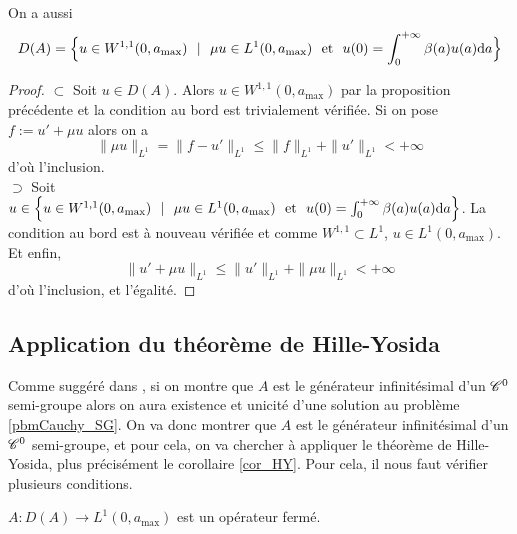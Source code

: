 \begin{proposition}\label{def_dA_bis}
    On a aussi 
    \begin{equation*}
        D(A) = \Big\{ u \in W^{1,1}(0,a_{\max}) \ \ | \ \ \mu u \in L^1(0,a_{\max}) \ \text{ et } \ u(0) = \int_0^{+\infty}\beta(a)u(a)\d a \Big\}
    \end{equation*}
\end{proposition}

\begin{proof}
    $\boxed{\subset}$ Soit $u \in D(A)$. Alors $u \in W^{1,1}(0,a_{\max})$ par la proposition précédente et la condition au bord est trivialement vérifiée. Si on pose $f:=u'+\mu u$ alors on a 
    \begin{equation*}
        \|\mu u \|_{L^1} = \|f-u'\|_{L^1} \leq \|f\|_{L^1}+\|u'\|_{L^1} <+\infty
    \end{equation*}
    d'où l'inclusion.
    \\
    $\boxed{\supset}$ Soit $u \in \Big\{ u \in W^{1,1}(0,a_{\max}) \ \ | \ \ \mu u \in L^1(0,a_{\max}) \ \text{ et } \ u(0) = \int_0^{+\infty}\beta(a)u(a)\d a \Big\}$. La condition au bord est à nouveau vérifiée et comme $W^{1,1} \subset L^1$, $u \in L^1(0,a_{\max})$. Et enfin, 
    \begin{equation*}
        \|u'+\mu u\|_{L^1} \leq \|u'\|_{L^1}+\|\mu u \|_{L^1} <+\infty
    \end{equation*}
    d'où l'inclusion, et l'égalité.
\end{proof}

\subsection{Application du théorème de Hille-Yosida}
Comme suggéré dans \cite[p.~100]{Pazy1983}, si on montre que $A$ est le générateur infinitésimal d'un $\mathscr{C}^0$ semi-groupe alors on aura existence et unicité d'une solution au problème \eqref{pbmCauchy_SG}. On va donc montrer que $A$ est le générateur infinitésimal d'un $\mathscr{C}^0$ semi-groupe, et pour cela, on va chercher à appliquer le théorème de Hille-Yosida, plus précisément le corollaire \ref{cor_HY}. Pour cela, il nous faut vérifier plusieurs conditions.

\begin{proposition}
    $A : D(A) \rightarrow L^1(0,a_{\max})$ est un opérateur fermé.
\end{proposition}

